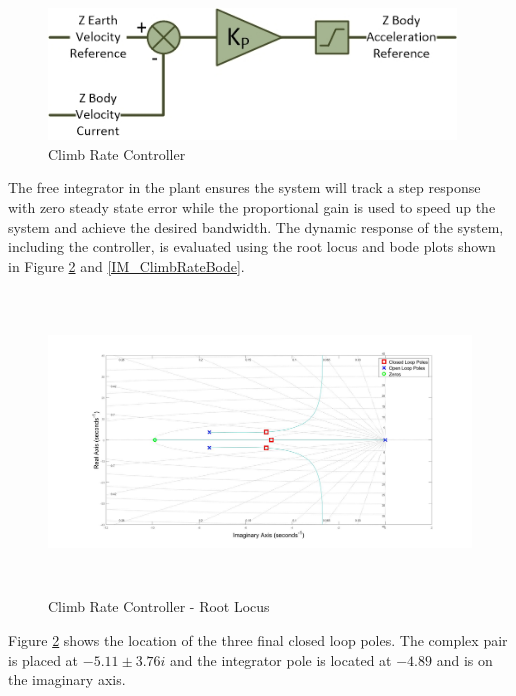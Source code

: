 \documentclass[12pt]{report}
\begin{document}
	\begin{figure}[H]
		\centering
		\includegraphics[height = 3.5cm]{../References/Diagrams/ClimbRateController.jpg}
		\caption{Climb Rate Controller}
		\label{IM_ClimbRateController}
	\end{figure}		
	
	The free integrator in the plant ensures the system will track a step response with zero steady state error while the proportional gain is used to speed up the system and achieve the desired bandwidth.
	The dynamic response of the system, including the controller, is evaluated using the root locus and bode plots shown in Figure \ref{IM_ClimbRateRoot} and \ref{IM_ClimbRateBode}.
	
	\begin{figure}[H]
		\centering
		\includegraphics[height = 8cm]{../Design/Matlab/Controllers/climb_rate_root.jpg}
		\caption{Climb Rate Controller -  Root Locus}
		\label{IM_ClimbRateRoot}
	\end{figure}
	
	Figure \ref{IM_ClimbRateRoot} shows the location of the three final closed loop poles. The complex pair is placed at $-5.11 \pm 3.76i$ and the integrator pole is located at $-4.89$ and is on the imaginary axis.
	
\end{document}

